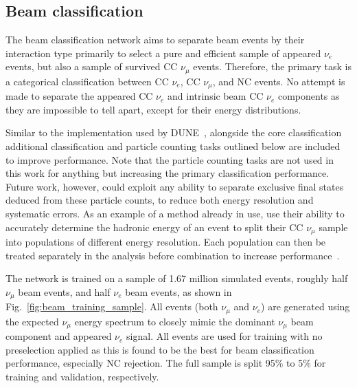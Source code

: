 \subsection{Beam classification}%
\label{sec:cvn_specific_beam} %

The beam classification network aims to separate beam events by their interaction type primarily
to select a pure and efficient sample of appeared $\nu_{e}$ events, but also a sample of survived
CC $\nu_{\mu}$ events. Therefore, the primary task is a categorical classification between CC
$\nu_{e}$, CC $\nu_{\mu}$, and NC events. No attempt is made to separate the appeared CC $\nu_{e}$
and intrinsic beam CC $\nu_{e}$ components as they are impossible to tell apart, except for their
energy distributions.

Similar to the implementation used by DUNE~\cite{collaboration2020}, alongside the core
classification additional classification and particle counting tasks outlined below are included
to improve performance. Note that the particle counting tasks are not used in this work for
anything but increasing the primary classification performance. Future work, however, could
exploit any ability to separate exclusive final states deduced from these particle counts, to
reduce both energy resolution and systematic errors. As an example of a method already in use,
\nova use their ability to accurately determine the hadronic energy of an event to split their CC
$\nu_{\mu}$ sample into populations of different energy resolution. Each population can then be
treated separately in the analysis before combination to increase performance~\cite{acero2018}.

The network is trained on a sample of 1.67 million simulated events, roughly half $\nu_{\mu}$ beam
events, and half $\nu_{e}$ beam events, as shown in Fig.~\ref{fig:beam_training_sample}. All
events (both $\nu_{\mu}$ and $\nu_{e}$) are generated using the expected \chips $\nu_{\mu}$ energy
spectrum to closely mimic the dominant $\nu_{\mu}$ beam component and appeared $\nu_{e}$ signal.
All events are used for training with no preselection applied as this is found to be the best for
beam classification performance, especially NC rejection. The full sample is split 95\% to 5\% for
training and validation, respectively.

